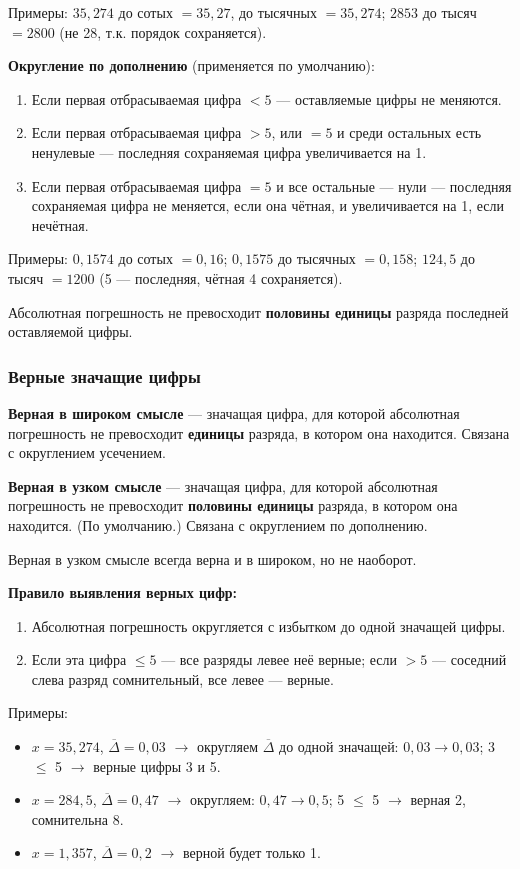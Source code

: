 \documentclass[14pt,a4paper]{extarticle}
\begin{document}
Примеры: $35{,}274$ до сотых $= 35{,}27$, до тысячных $= 35{,}274$; $2853$ до тысяч $= 2800$ (не 28, т.к. порядок сохраняется).

\textbf{Округление по дополнению} (применяется по умолчанию):
\begin{enumerate}
    \item Если первая отбрасываемая цифра $< 5$ --- оставляемые цифры не меняются.
    \item Если первая отбрасываемая цифра $> 5$, или $= 5$ и среди остальных есть ненулевые --- последняя сохраняемая цифра увеличивается на 1.
    \item Если первая отбрасываемая цифра $= 5$ и все остальные --- нули --- последняя сохраняемая цифра не меняется, если она чётная, и увеличивается на 1, если нечётная.
\end{enumerate}

Примеры: $0{,}1574$ до сотых $= 0{,}16$; $0{,}1575$ до тысячных $= 0{,}158$; $124{,}5$ до тысяч $= 1200$ (5 --- последняя, чётная 4 сохраняется).

Абсолютная погрешность не превосходит \textbf{половины единицы} разряда последней оставляемой цифры.

\subsubsection{Верные значащие цифры}

\textbf{Верная в широком смысле} --- значащая цифра, для которой абсолютная погрешность не превосходит \textbf{единицы} разряда, в котором она находится. Связана с округлением усечением.

\textbf{Верная в узком смысле} --- значащая цифра, для которой абсолютная погрешность не превосходит \textbf{половины единицы} разряда, в котором она находится. (По умолчанию.) Связана с округлением по дополнению.

Верная в узком смысле всегда верна и в широком, но не наоборот.

\textbf{Правило выявления верных цифр:}
\begin{enumerate}
    \item Абсолютная погрешность округляется с избытком до одной значащей цифры.
    \item Если эта цифра $\leq 5$ --- все разряды левее неё верные; если $> 5$ --- соседний слева разряд сомнительный, все левее --- верные.
\end{enumerate}

Примеры:
\begin{itemize}
    \item $x = 35{,}274$, $\overline{\Delta} = 0{,}03$ $\rightarrow$ округляем $\overline{\Delta}$ до одной значащей: $0{,}03 \to 0{,}03$; 3 $\leq$ 5 $\rightarrow$ верные цифры 3 и 5.
    \item $x = 284{,}5$, $\overline{\Delta} = 0{,}47$ $\rightarrow$ округляем: $0{,}47 \to 0{,}5$; 5 $\leq$ 5 $\rightarrow$ верная 2, сомнительна 8.
    \item $x = 1{,}357$, $\overline{\Delta} = 0{,}2$ $\rightarrow$ верной будет только 1.
\end{itemize}
\end{document}
